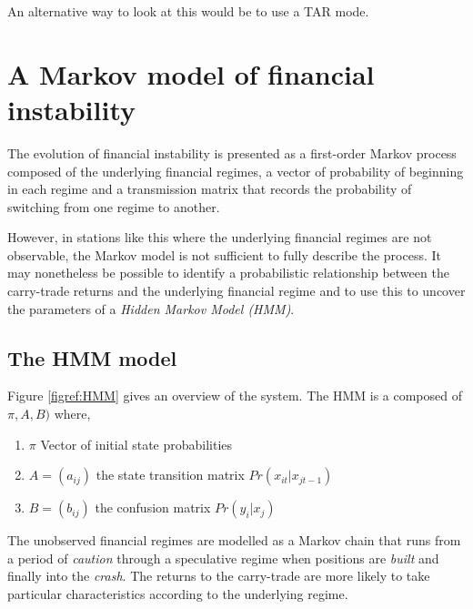 \documentclass[12pt, a4paper, oneside]{article} %
\begin{document}


An alternative way to look at this would be to use a TAR mode.  

\section{A Markov model of financial instability}
The evolution of financial instability is presented as a first-order Markov process composed of the underlying financial regimes, a vector of probability of beginning in each regime and a transmission matrix that records the probability of switching from one regime to another. 

However, in stations like this where the underlying financial regimes are not observable, the Markov model is not sufficient to fully describe the process. It may nonetheless be possible to identify a probabilistic relationship between the carry-trade returns and the underlying financial regime and to use this to uncover the parameters of a \emph{Hidden Markov Model (HMM)}. 
 
\subsection{The HMM model}
Figure \ref{figref:HMM} gives an overview of the system.  The HMM is a composed of $\pi, A, B)$ where,

\begin{enumerate}
\item $\pi$ Vector of initial state probabilities
\item $A = (a_{ij})$ the state transition matrix $Pr(x_{it}|x_{jt-1})$
\item $B = (b_{ij})$ the confusion matrix $Pr(y_i|x_j)$
\end{enumerate}

The unobserved financial regimes are modelled as a Markov chain that runs from a period of \emph{caution} through a speculative regime when positions are \emph{built} and finally into the \emph{crash}.  The returns to the carry-trade are more likely to take particular characteristics according to the underlying regime.   
\end{document}

